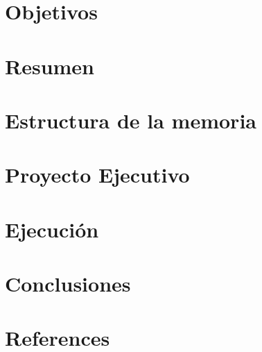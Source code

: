 \documentclass[12pt,a4paper,spanish]{article}
\begin{document}
    
%	
    
    \glsaddall
    \printnoidxglossary[style=tree,title=Glosario,nonumberlist]\label{sec:glossary}

    \newpage
    \section{Objetivos}\label{sec:objetivos}
    

    \newpage
    \section{Resumen}\label{sec:introduccion}
    

    \newpage
    \section{Estructura de la memoria}\label{sec:estructura}
    

    \newpage
    \section{Proyecto Ejecutivo}\label{sec:proyecto_ejecutivo}
    

    \newpage
    \section{Ejecución}\label{sec:ejecucion}
    
%		

    \newpage
    \section{Conclusiones}\label{sec:conclusiones}
    
%
%    


    \section{References}\label{sec:references}
\end{document}
